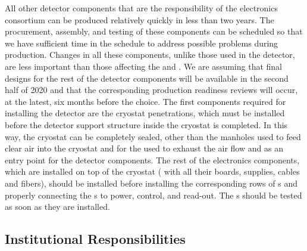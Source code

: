 All other detector components that are the responsibility of the
 electronics consortium can be produced relatively quickly
in less than two years. The procurement, assembly, and
testing of these components can be scheduled so that
we have sufficient time in the schedule to address possible 
problems during production. Changes in all these
components, unlike those used in the  detector,
are less important than those affecting the 
and . We are assuming that final
designs for the rest of the detector components will be 
available in the second half of 2020 and that the corresponding 
production readiness reviews will occur, at the latest, six months 
before the  choice.
The first components 
required for installing the detector are the cryostat 
penetrations, which must be installed before the 
detector support structure inside the cryostat is completed.
In this way, the cryostat can be completely sealed, other than
the manholes used to feed clear air into the cryostat
and for the  used to exhaust the air flow
and as an entry point for the detector components. The rest of the
 electronics components, which are installed on top of the 
cryostat ( with all their boards, supplies, cables
and fibers), should be installed before installing
the corresponding rows of s and properly connecting 
the s to power, control, and read-out. 
The s should be tested as soon as they are installed. 

\subsection{Institutional Responsibilities}
\label{sec:fdsp-tpcelec-management-resp}

